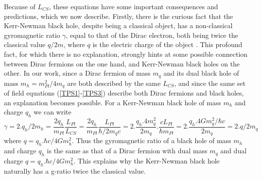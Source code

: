 \documentclass[prd, preprint, 12pt]{revtex4-1}
\begin{document}
 Because of $L_{CS}$, these equations have some important consequences and predictions, which we now describe. Firstly, there is the curious fact that the Kerr-Newman black hole, despite being a classical object, has a non-classical gyromagnetic ratio $\gamma$, equal to that of the Dirac electron, both being twice the classical value $q/2m$, where $q$ is the electric charge of the object \cite{Newman}. This profound fact, for which there is no explanation, strongly hints at some possible connection between Dirac fermions on the one hand, and Kerr-Newman black holes on the other. In our work, since a Dirac fermion of mass $m_q$ and its dual black hole of mass $m_h = m_{Pl}^2 / 4m_q$ are both described by the same $L_{CS}$, and since the same set of field equations (\ref{TPS1}-\ref{TPS3}) describe both Dirac fermions and black holes, an explanation becomes possible. For a Kerr-Newman black hole of mass $m_h$ and charge $q_h$  we can write
 \begin{equation}
  \gamma = 2. q_h/2m_h = \frac{2q_h}{m_{Pl}} \frac{L_{Pl}}{L_{CS}} = \frac{2q_h}{m_{Pl}}\frac{L_{Pl}}{\hbar/2m_q c}
  =  2. \frac{q_h.4m_q^2}{2m_q}.\frac{cL_{Pl}}{\hbar m_{Pl}} = 2. \frac{q_h.4Gm_q^2/\hbar c}{2m_q} = 2. q/2m_q
  \end{equation}
  where $q=q_h.\hbar c/4Gm_h^2$.
  Thus the gyromagnetic ratio of a black hole of mass $m_h$ and charge $q_h$ is the same as that of a Dirac fermion with dual mass $m_q$ and dual charge $q= q_h.\hbar c/4Gm_h^2$. This explains why the Kerr-Newman black hole naturally has a g-ratio twice the classical value.
  
\end{document}
